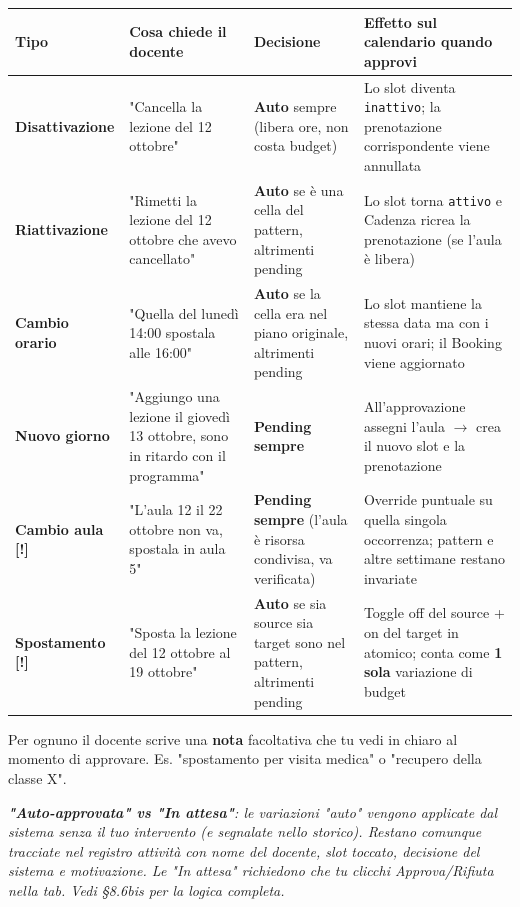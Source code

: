 \documentclass[11pt,a4paper]{article}
\renewenvironment{quote}
  {\begin{list}{}{%
      \setlength{\leftmargin}{8pt}%
      \setlength{\rightmargin}{8pt}%
      \setlength{\topsep}{6pt}%
      \setlength{\parsep}{0pt}}%
      \item\relax\color{black!75}\itshape}
  {\end{list}}
\begin{document}
\begin{table}[H]
\centering
\small
\begin{tabularx}{\linewidth}{|X|X|X|X|}
\hline
\rowcolor{tableheader} Tipo & Cosa chiede il docente & Decisione & Effetto sul calendario quando approvi \\
\hline
\textbf{Disattivazione} & "Cancella la lezione del 12 ottobre" & \textbf{Auto} sempre (libera ore, non costa budget) & Lo slot diventa \texttt{inattivo}; la prenotazione corrispondente viene annullata \\
\hline
\textbf{Riattivazione} & "Rimetti la lezione del 12 ottobre che avevo cancellato" & \textbf{Auto} se è una cella del pattern, altrimenti pending & Lo slot torna \texttt{attivo} e Cadenza ricrea la prenotazione (se l'aula è libera) \\
\hline
\textbf{Cambio orario} & "Quella del lunedì 14:00 spostala alle 16:00" & \textbf{Auto} se la cella era nel piano originale, altrimenti pending & Lo slot mantiene la stessa data ma con i nuovi orari; il Booking viene aggiornato \\
\hline
\textbf{Nuovo giorno} & "Aggiungo una lezione il giovedì 13 ottobre, sono in ritardo con il programma" & \textbf{Pending sempre} & All'approvazione assegni l'aula $\rightarrow$ crea il nuovo slot e la prenotazione \\
\hline
\textbf{Cambio aula} \textbf{[!]} & "L'aula 12 il 22 ottobre non va, spostala in aula 5" & \textbf{Pending sempre} (l'aula è risorsa condivisa, va verificata) & Override puntuale su quella singola occorrenza; pattern e altre settimane restano invariate \\
\hline
\textbf{Spostamento} \textbf{[!]} & "Sposta la lezione del 12 ottobre al 19 ottobre" & \textbf{Auto} se sia source sia target sono nel pattern, altrimenti pending & Toggle off del source + on del target in atomico; conta come \textbf{1 sola} variazione di budget \\
\hline
\end{tabularx}
\end{table}


Per ognuno il docente scrive una \textbf{nota} facoltativa che tu vedi in chiaro al momento di approvare. Es. "spostamento per visita medica" o "recupero della classe X".

\begin{quote}
\textbf{"Auto-approvata" vs "In attesa"}: le variazioni "auto" vengono applicate dal sistema senza il tuo intervento (e segnalate nello storico). Restano comunque tracciate nel registro attività con nome del docente, slot toccato, decisione del sistema e motivazione. Le "In attesa" richiedono che tu clicchi Approva/Rifiuta nella tab. Vedi §8.6bis per la logica completa.
\end{quote}
\end{document}

